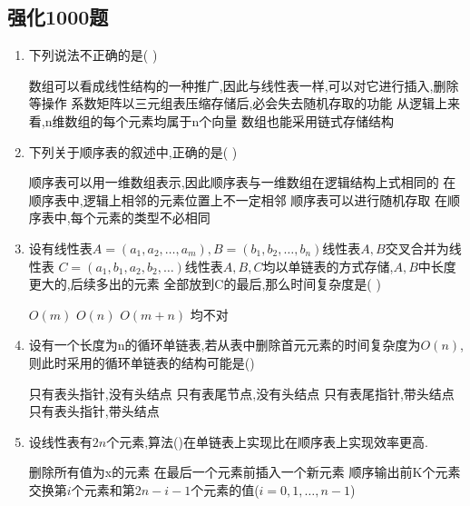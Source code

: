 \documentclass[12pt, a4paper, oneside, UTF8]{ctexbook}
\begin{document}
\subsection{强化1000题}
\begin{enumerate}
    \item \bl 下列说法不正确的是(   ) 
    \begin{choices}[1]
        \task 数组可以看成线性结构的一种推广,因此与线性表一样,可以对它进行插入,删除等操作 
        \task 系数矩阵以三元组表压缩存储后,必会失去随机存取的功能
        \task 从逻辑上来看,n维数组的每个元素均属于n个向量
        \task 数组也能采用链式存储结构
    \end{choices}

    \item 下列关于顺序表的叙述中,正确的是(   ) 
    \begin{choices}[1]
        \task \bl 顺序表可以用一维数组表示,因此顺序表与一维数组在逻辑结构上式相同的
        \task 在顺序表中,逻辑上相邻的元素位置上不一定相邻
        \task 顺序表可以进行随机存取
        \task 在顺序表中,每个元素的类型不必相同 
    \end{choices}

    \item \bl 设有线性表$A=(a_1,a_2,\ldots,a_m),B=(b_1,b_2,\ldots,b_n)$线性表$A,B$交叉合并为线性表
    $C=(a_1,b_1,a_2,b_2,\ldots)$线性表$A,B,C$均以单链表的方式存储,$A,B$中长度更大的,后续多出的元素
    全部放到C的最后,那么时间复杂度是(    )
    \begin{choices}
        \task $O(m)$ \task $O(n)$ \task $O(m+n)$ \task 均不对
    \end{choices}

    \item 设有一个长度为n的循环单链表,若从表中删除首元元素的时间复杂度为$O(n)$,则此时采用的循环单链表的结构可能是()
    \begin{choices}[2]
        \task 只有表头指针,没有头结点 \task 只有表尾节点,没有头结点 
        \task 只有表尾指针,带头结点 \task 只有表头指针,带头结点
    \end{choices}

    \item 设线性表有$2n$个元素,算法()在单链表上实现比在顺序表上实现效率更高. 
    \begin{choices}[1]
        \task 删除所有值为x的元素 
        \task 在最后一个元素前插入一个新元素 
        \task 顺序输出前K个元素 
        \task 交换第$i$个元素和第$2n-i-1$个元素的值($i=0,1,\ldots,n-1$) 
    \end{choices}


\end{enumerate}
\end{document}
